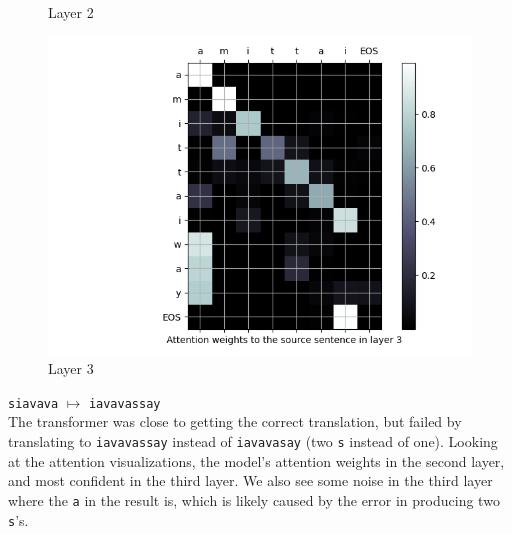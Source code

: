 \begin{enumarabic}
\begin{figure}[H]
\begin{minipage}[b]{0.33\textwidth}
        \caption{Layer 2}
        \label{fig:amittai-1}
      \end{minipage}
      \begin{minipage}[b]{0.33\textwidth}
        \centering
        \includegraphics[width=\textwidth]{figures/amittai-2.png}
        \caption{Layer 3}
        \label{fig:amittai-2}
      \end{minipage}
    \end{figure}

  \item \verb|siavava| $\mapsto$ \verb|iavavassay| \\
    The transformer was close to getting the correct translation,
    but failed by translating to \verb|iavavassay| instead of \verb|iavavasay|
    (two \verb|s| instead of one).
    Looking at the attention visualizations, the model's attention weights
    in the second layer, and most confident in the third layer.
    We also see some noise in the third layer where the \verb|a|
    in the result is, which is likely caused by the error in producing two \verb|s|'s.


\end{enumarabic}
